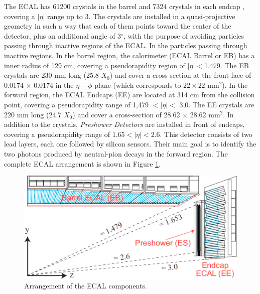 \noindent The ECAL has 61200 crystals in the barrel and 7324 crystals in each endcap \cite{chp2:CMSTDR}, covering a 
$|\eta|$ range up to 3. The crystals are installed in a quasi-projective geometry 
in such a way that each of them points toward the center of the detector, plus an additional angle
of 3$^{\circ}$, with the purpose of avoiding particles passing through inactive regions of the ECAL. In the 
particles passing through inactive regions. In the barrel region, the calorimeter (ECAL Barrel or EB) has a 
inner radius of 129 cm, covering a pseudorapidity region of $|\eta| < $1.479. The EB crystals 
are 230 mm long (25.8 $X_{0}$) and cover a cross-section at the front face of 0.0174 $\times$ 0.0174 
in the $\eta-\phi$ plane (which corresponds to $22\times22$ mm$^{2}$). In the forward region,
the ECAL Endcaps (EE) are located at 314 cm from the collision point, covering a pseudorapidity range of
1,479 $ < |\eta| < $ 3,0. The EE crystals are 220 mm long (24.7 $X_{0}$) and cover
a cross-section of 28.62 $\times$ 28.62 mm$^{2}$. In addition to the crystals, \textit{Preshower Detectors}
are installed in front of endcaps, covering a pseudorapidity range of  $1.65<|\eta|<2.6$. This detector consists of two 
lead layers, each one followed by silicon sensors. Their main goal is 
to identify the two photons produced by neutral-pion decays in the
forward region. The complete ECAL arrangement is shown in Figure \ref{figchp2:ECALcrytal}.



\begin{center}
\begin{figure}[h]
\centering
\includegraphics[scale=0.38]{figuras/Chapter2/ECAL.pdf}
\caption{Arrangement of the ECAL components.}\label{figchp2:ECALcrytal}
\end{figure}
\end{center}

